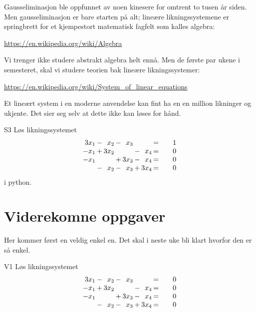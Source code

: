 Gausseliminasjon ble oppfunnet av noen kinesere for omtrent to tusen år siden. 
Men gausseliminasjon er bare starten på alt;
lineære likningssystemene er springbrett for et kjempestort matematisk fagfelt som kalles algebra:

\url{https://en.wikipedia.org/wiki/Algebra}

Vi trenger ikke studere abstrakt algebra helt ennå.
Men de første par ukene i semesteret, 
skal vi studere teorien bak lineære likningssystemer:

\url{https://en.wikipedia.org/wiki/System_of_linear_equations}



Et lineært system i en moderne anvendelse kan fint ha en en million likninger og ukjente. 
Det sier seg selv at dette ikke kan løses for hånd.

\begin{oppgave}{S3}
Løs likningssystemet
\[
\setlength\arraycolsep{1pt}
\begin{array}{rcrcrcrc@{\qquad}l}
3x_1  &  - &   x_2    & - &   x_3   &  &      &   =   &  1 \\
-x_1 & + &   3x_2   &  &     & - &   x_4   &   =   &  0 \\
-x_1 &    &        & + &   3x_3  &  - &   x_4   &  =   &   0\\
   &  - &   x_2   &  - &    x_3   &  + &   3x_4   &  =   &  0 
\end{array}
\]
i python.
\end{oppgave}



\section*{Viderekomne oppgaver}

Her kommer først en veldig enkel en. 
Det skal i neste uke bli klart hvorfor den er så enkel.

\begin{oppgave}{V1}
Løs likningssystemet
\[
\setlength\arraycolsep{1pt}
\begin{array}{rcrcrcrc@{\qquad}l}
3x_1  &  - &   x_2    & - &   x_3   &  &      &   =   &  0  \\
-x_1 & + &   3x_2   &  &     & - &   x_4   &   =   &  0 \\
-x_1 &    &        & +  &   3x_3  &  - &   x_4   &  =   &   0\\
   &  - &   x_2   &  - &    x_3   &  + &   3x_4   &  =   &  0 
\end{array}
\]
\end{oppgave}

